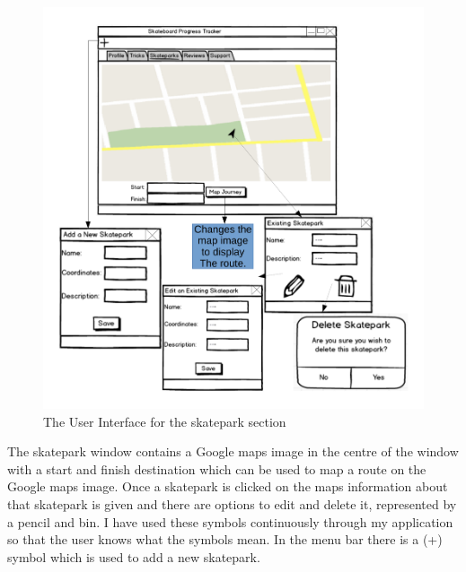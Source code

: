 \begin{figure}[H]
    \includegraphics[width=\textwidth]{./Design/SkateparkUI.pdf}
    \caption{The User Interface for the skatepark section} \label{fig: SkateparkUser Interface}
\end{figure}

The skatepark window contains a Google maps image in the centre of the window with a start and finish destination which can be used to map a route on the Google maps image. Once a skatepark is clicked on the maps information about that skatepark is given and there are options to edit and delete it, represented by a pencil and bin. I have used these symbols continuously through my application so that the user knows what the symbols mean. In the menu bar there is a (+) symbol which is used to add a new skatepark. 

